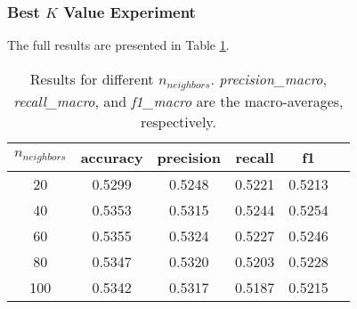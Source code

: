 \documentclass[times, twocolumn]{article}
\begin{document}
\subsubsection{Best $K$ Value Experiment}
The full results are presented in Table \ref{table:result}.
\begin{table}
    \begin{center}
        \begin{tabular}{|c||c|c|c|c|c|} \hline
            $n_{neighbors}$ & accuracy & precision & recall & f1
            \\ \hline
            20  & 0.5299 & 0.5248 & 0.5221 & 0.5213 \\
            40  & 0.5353 & 0.5315 & 0.5244 & 0.5254 \\
            60  & 0.5355 & 0.5324 & 0.5227 & 0.5246 \\
            80  & 0.5347 & 0.5320 & 0.5203 & 0.5228 \\
            100 & 0.5342 & 0.5317 & 0.5187 & 0.5215 \\
            \hline
        \end{tabular}
        \caption{Results for different $n_{neighbors}$. \textit{precision\_macro}, \textit{recall\_macro}, and \textit{f1\_macro} are the macro-averages, respectively.}
        \label{table:result}
    \end{center}
\end{table}
\end{document}
